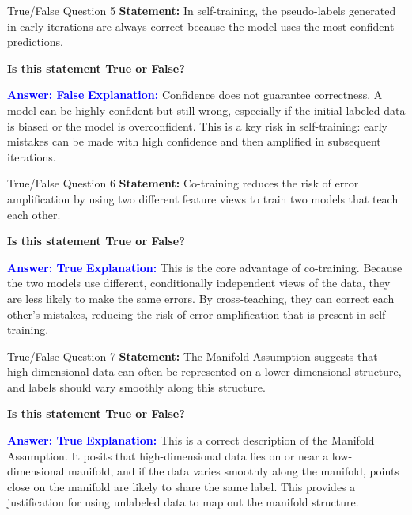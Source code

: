 \documentclass{beamer}
\begin{document}
	\begin{frame}{True/False Question 5}
		\textbf{Statement:} In self-training, the pseudo-labels generated in early iterations are always correct because the model uses the most confident predictions.
		
		\vspace{0.3cm}
		\textbf{Is this statement True or False?}
		
		\vspace{0.2cm}
		\textcolor{blue}{\textbf{Answer: False}}
		\vspace{0.2cm}
		\textcolor{blue}{\textbf{Explanation:}} Confidence does not guarantee correctness. A model can be highly confident but still wrong, especially if the initial labeled data is biased or the model is overconfident. This is a key risk in self-training: early mistakes can be made with high confidence and then amplified in subsequent iterations.
	\end{frame}
	
	\begin{frame}{True/False Question 6}
		\textbf{Statement:} Co-training reduces the risk of error amplification by using two different feature views to train two models that teach each other.
		
		\vspace{0.3cm}
		\textbf{Is this statement True or False?}
		
		\vspace{0.2cm}
		\textcolor{blue}{\textbf{Answer: True}}
		\vspace{0.2cm}
		\textcolor{blue}{\textbf{Explanation:}} This is the core advantage of co-training. Because the two models use different, conditionally independent views of the data, they are less likely to make the same errors. By cross-teaching, they can correct each other's mistakes, reducing the risk of error amplification that is present in self-training.
	\end{frame}
	
	\begin{frame}{True/False Question 7}
		\textbf{Statement:} The Manifold Assumption suggests that high-dimensional data can often be represented on a lower-dimensional structure, and labels should vary smoothly along this structure.
		
		\vspace{0.3cm}
		\textbf{Is this statement True or False?}
		
		\vspace{0.2cm}
		\textcolor{blue}{\textbf{Answer: True}}
		\vspace{0.2cm}
		\textcolor{blue}{\textbf{Explanation:}} This is a correct description of the Manifold Assumption. It posits that high-dimensional data lies on or near a low-dimensional manifold, and if the data varies smoothly along the manifold, points close on the manifold are likely to share the same label. This provides a justification for using unlabeled data to map out the manifold structure.
	\end{frame}
	
\end{document}
